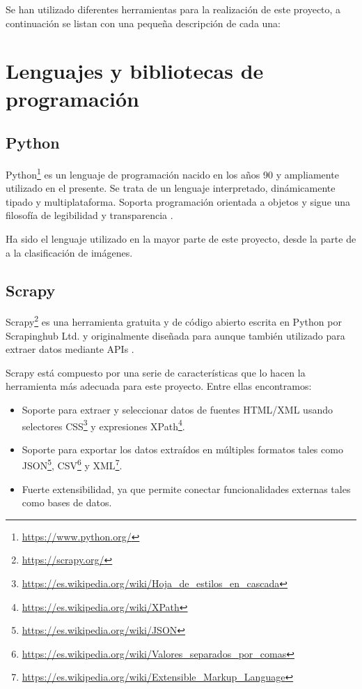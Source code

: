 
Se han utilizado diferentes herramientas para la realización de este proyecto, a continuación se listan con una pequeña descripción de cada una:


\section{Lenguajes y bibliotecas de programación}


\subsection{Python}
Python\footnote{\url{https://www.python.org/}} es un lenguaje de programación nacido en los años 90 y ampliamente utilizado en el presente. Se trata de un lenguaje interpretado, dinámicamente tipado y multiplataforma. Soporta programación orientada a objetos y sigue una filosofía de legibilidad y transparencia \cite{wiki:python}.

Ha sido el lenguaje utilizado en la mayor parte de este proyecto, desde la parte de  a la clasificación de imágenes.


\subsection{Scrapy}
Scrapy\footnote{\url{https://scrapy.org/}} es una herramienta gratuita y de código abierto escrita en Python por Scrapinghub Ltd. y originalmente diseñada para  aunque también utilizado para extraer datos mediante APIs \cite{wiki:scrapy}.

Scrapy está compuesto por una serie de características que lo hacen la herramienta más adecuada para este proyecto. Entre ellas encontramos:

\begin{itemize}
	\item Soporte para extraer y seleccionar datos de fuentes HTML/XML usando selectores CSS\footnote{\url{https://es.wikipedia.org/wiki/Hoja_de_estilos_en_cascada}} y expresiones XPath\footnote{\url{https://es.wikipedia.org/wiki/XPath}}.
	\item Soporte para exportar los datos extraídos en múltiples formatos tales como JSON\footnote{\url{https://es.wikipedia.org/wiki/JSON}}, CSV\footnote{\url{https://es.wikipedia.org/wiki/Valores_separados_por_comas}} y XML\footnote{\url{https://es.wikipedia.org/wiki/Extensible_Markup_Language}}.
	\item Fuerte extensibilidad, ya que permite conectar funcionalidades externas tales como bases de datos.
\end{itemize}


